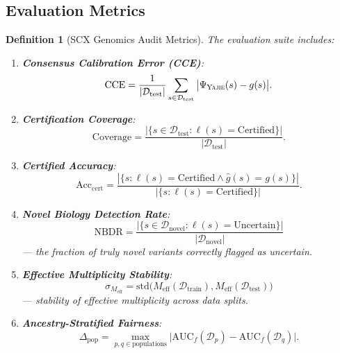 \documentclass[11pt,a4paper]{article}
\newtheorem{definition}[theorem]{Definition}
\theoremstyle{definition}
\newcommand{\calD}{\mathcal{D}}
\newcommand{\yajie}{\textsc{Yajie}}
\newcommand{\consensus}{\Psi}
\begin{document}
\subsection{Evaluation Metrics}
\begin{definition}[SCX Genomics Audit Metrics]
\label{def:metrics}
The evaluation suite includes:
\begin{enumerate}[leftmargin=*,label=\textbf{M\arabic*}]
    \item \textbf{Consensus Calibration Error (CCE)}:
    \begin{equation}
        \text{CCE} = \frac{1}{|\calD_{\text{test}}|} \sum_{s \in \calD_{\text{test}}} \big|\consensus_{\yajie}(s) - g(s)\big|.
    \end{equation}
    \item \textbf{Certification Coverage}:
    \begin{equation}
        \text{Coverage} = \frac{|\{s \in \calD_{\text{test}} : \ell(s) = \text{Certified}\}|}{|\calD_{\text{test}}|}.
    \end{equation}
    \item \textbf{Certified Accuracy}:
    \begin{equation}
        \text{Acc}_{\text{cert}} = \frac{|\{s : \ell(s) = \text{Certified} \land \hat{g}(s) = g(s)\}|}{|\{s : \ell(s) = \text{Certified}\}|}.
    \end{equation}
    \item \textbf{Novel Biology Detection Rate}:
    \begin{equation}
        \text{NBDR} = \frac{|\{s \in \calD_{\text{novel}} : \ell(s) = \text{Uncertain}\}|}{|\calD_{\text{novel}}|}
    \end{equation}
    — the fraction of truly novel variants correctly flagged as uncertain.
    \item \textbf{Effective Multiplicity Stability}:
    \begin{equation}
        \sigma_{M_{\text{eff}}} = \text{std}\big(M_{\text{eff}}(\calD_{\text{train}}), M_{\text{eff}}(\calD_{\text{test}})\big)
    \end{equation}
    — stability of effective multiplicity across data splits.
    \item \textbf{Ancestry-Stratified Fairness}:
    \begin{equation}
        \Delta_{\text{pop}} = \max_{p,q \in \text{populations}} \big| \text{AUC}_f(\calD_p) - \text{AUC}_f(\calD_q) \big|.
    \end{equation}
\end{enumerate}
\end{definition}
\end{document}
